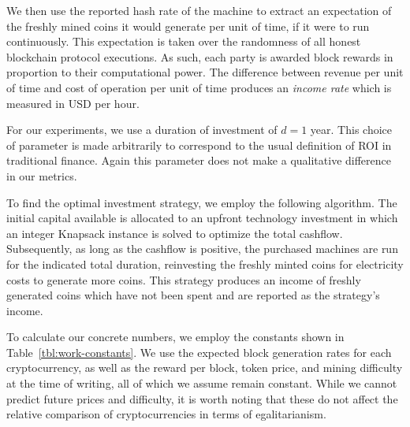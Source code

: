 

We then use the reported hash rate of the machine to extract an expectation of
the freshly mined coins it would generate per unit of time, if it were to run
continuously. This expectation is taken over the randomness of all honest
blockchain protocol executions. As such, each party is awarded block rewards in
proportion to their computational power. The difference between revenue per unit
of time and cost of operation per unit of time produces an \emph{income rate}
which is measured in USD per hour.

For our experiments, we use a duration of investment of $d = 1$
year. This choice of parameter is made arbitrarily to correspond to the usual
definition of ROI in traditional finance. Again this parameter does not make a
qualitative difference in our metrics.


To find the optimal investment strategy, we employ the following algorithm. The
initial capital available is allocated to an upfront technology investment in
which an integer Knapsack instance is solved to optimize the total cashflow.
Subsequently, as long as the cashflow is positive, the purchased machines are
run for the indicated total duration, reinvesting the freshly minted coins for
electricity costs to generate more coins. This strategy produces an income of
freshly generated coins which have not been spent and are reported as the
strategy's income.

To calculate our concrete numbers, we employ the constants shown in
Table~\ref{tbl:work-constants}. We use the expected block generation rates
for each cryptocurrency, as well as the reward per block, token price, and
mining difficulty at the time of writing, all of which we assume remain
constant. While we cannot predict future prices and difficulty, it is worth
noting that these do not affect the relative comparison of cryptocurrencies in
terms of egalitarianism.

